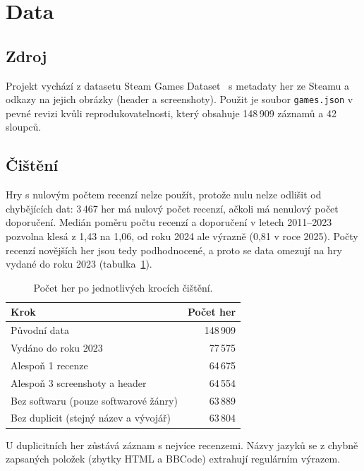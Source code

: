 \section{Data}

\subsection*{Zdroj}

Projekt vychází z datasetu Steam Games Dataset~\cite{fronkon_dataset} s metadaty her ze Steamu
a odkazy na jejich obrázky (header a screenshoty). Použit je soubor \texttt{games.json} v pevné
revizi kvůli reprodukovatelnosti, který obsahuje 148\,909 záznamů a 42 sloupců.

\subsection*{Čištění}

Hry s nulovým počtem recenzí nelze použít, protože nulu nelze odlišit od chybějících dat:
3\,467 her má nulový počet recenzí, ačkoli má nenulový počet doporučení. Medián poměru počtu
recenzí a doporučení v letech 2011--2023 pozvolna klesá z 1,43 na 1,06, od roku 2024 ale
výrazně (0,81 v roce 2025). Počty recenzí novějších her jsou tedy podhodnocené, a proto se data
omezují na hry vydané do roku 2023 (tabulka~\ref{tab:cisteni}).

\begin{table}[h]
    \centering
    \begin{tabular}{lr}
        \toprule
        Krok & Počet her \\
        \midrule
        Původní data & 148\,909 \\
        Vydáno do roku 2023 & 77\,575 \\
        Alespoň 1 recenze & 64\,675 \\
        Alespoň 3 screenshoty a header & 64\,554 \\
        Bez softwaru (pouze softwarové žánry) & 63\,889 \\
        Bez duplicit (stejný název a vývojář) & 63\,804 \\
        \bottomrule
    \end{tabular}
    \caption{Počet her po jednotlivých krocích čištění.}
    \label{tab:cisteni}
\end{table}

U duplicitních her zůstává záznam s nejvíce recenzemi. Názvy jazyků se z chybně zapsaných
položek (zbytky HTML a BBCode) extrahují regulárním výrazem.

